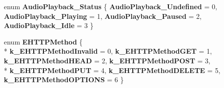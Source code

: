 \begin{DoxyCompactItemize}
\item 
\hypertarget{namespaceValve_1_1Steamworks_a7e82ee7851c6d5719ce8d2dd9e355555}{}enum {\bfseries Audio\+Playback\+\_\+\+Status} \{ {\bfseries Audio\+Playback\+\_\+\+Undefined} = 0, 
{\bfseries Audio\+Playback\+\_\+\+Playing} = 1, 
{\bfseries Audio\+Playback\+\_\+\+Paused} = 2, 
{\bfseries Audio\+Playback\+\_\+\+Idle} = 3
 \}\label{namespaceValve_1_1Steamworks_a7e82ee7851c6d5719ce8d2dd9e355555}

\item 
\hypertarget{namespaceValve_1_1Steamworks_a5b19d4ffc1134884682b3abf014ccfb9}{}enum {\bfseries E\+H\+T\+T\+P\+Method} \{ \\*
{\bfseries k\+\_\+\+E\+H\+T\+T\+P\+Method\+Invalid} = 0, 
{\bfseries k\+\_\+\+E\+H\+T\+T\+P\+Method\+G\+E\+T} = 1, 
{\bfseries k\+\_\+\+E\+H\+T\+T\+P\+Method\+H\+E\+A\+D} = 2, 
{\bfseries k\+\_\+\+E\+H\+T\+T\+P\+Method\+P\+O\+S\+T} = 3, 
\\*
{\bfseries k\+\_\+\+E\+H\+T\+T\+P\+Method\+P\+U\+T} = 4, 
{\bfseries k\+\_\+\+E\+H\+T\+T\+P\+Method\+D\+E\+L\+E\+T\+E} = 5, 
{\bfseries k\+\_\+\+E\+H\+T\+T\+P\+Method\+O\+P\+T\+I\+O\+N\+S} = 6
 \}\label{namespaceValve_1_1Steamworks_a5b19d4ffc1134884682b3abf014ccfb9}


\end{DoxyCompactItemize}
